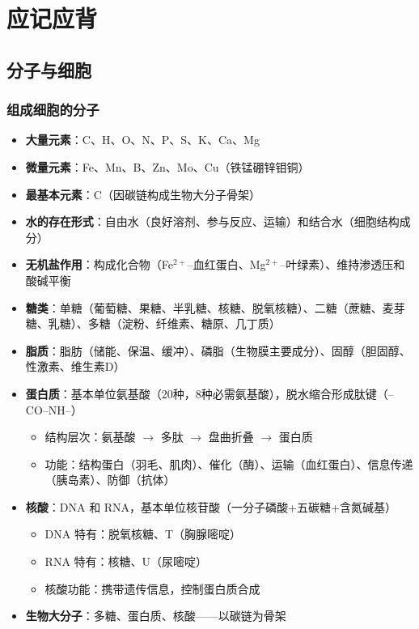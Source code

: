 \section{应记应背}

\subsection{分子与细胞}

\subsubsection{组成细胞的分子}

\begin{itemize}
  \item \textbf{大量元素}：C、H、O、N、P、S、K、Ca、Mg
  \item \textbf{微量元素}：Fe、Mn、B、Zn、Mo、Cu（铁锰硼锌钼铜）
  \item \textbf{最基本元素}：C（因碳链构成生物大分子骨架）
  \item \textbf{水的存在形式}：自由水（良好溶剂、参与反应、运输）和结合水（细胞结构成分）
  \item \textbf{无机盐作用}：构成化合物（Fe$^{2+}$--血红蛋白、Mg$^{2+}$--叶绿素）、维持渗透压和酸碱平衡
  \item \textbf{糖类}：单糖（葡萄糖、果糖、半乳糖、核糖、脱氧核糖）、二糖（蔗糖、麦芽糖、乳糖）、多糖（淀粉、纤维素、糖原、几丁质）
  \item \textbf{脂质}：脂肪（储能、保温、缓冲）、磷脂（生物膜主要成分）、固醇（胆固醇、性激素、维生素D）
  \item \textbf{蛋白质}：基本单位氨基酸（20种，8种必需氨基酸），脱水缩合形成肽键（--CO--NH--）
  \begin{itemize}
    \item 结构层次：氨基酸 $\to$ 多肽 $\to$ 盘曲折叠 $\to$ 蛋白质
    \item 功能：结构蛋白（羽毛、肌肉）、催化（酶）、运输（血红蛋白）、信息传递（胰岛素）、防御（抗体）
  \end{itemize}
  \item \textbf{核酸}：DNA 和 RNA，基本单位核苷酸（一分子磷酸+五碳糖+含氮碱基）
  \begin{itemize}
    \item DNA 特有：脱氧核糖、T（胸腺嘧啶）
    \item RNA 特有：核糖、U（尿嘧啶）
    \item 核酸功能：携带遗传信息，控制蛋白质合成
  \end{itemize}
  \item \textbf{生物大分子}：多糖、蛋白质、核酸——以碳链为骨架
\end{itemize}

